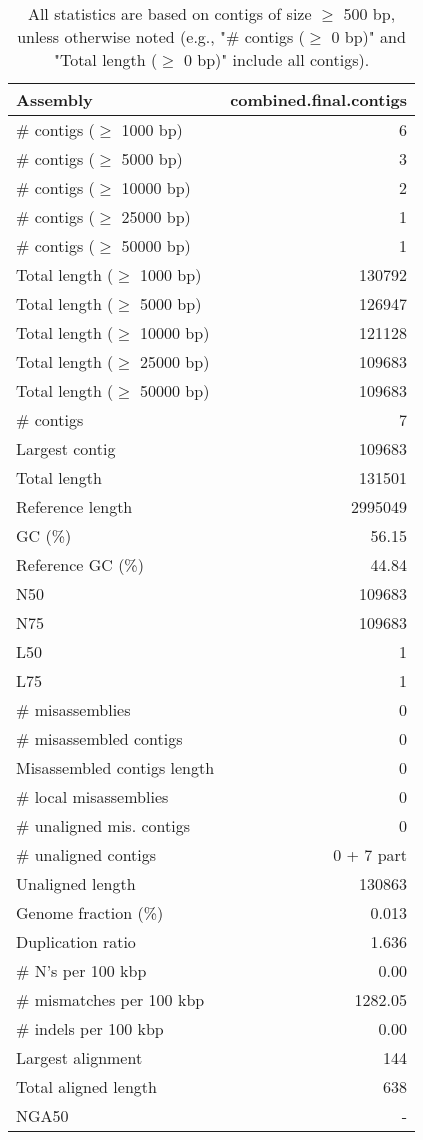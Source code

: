 \documentclass[12pt,a4paper]{article}
\begin{document}
\begin{table}[ht]
\begin{center}
\caption{All statistics are based on contigs of size $\geq$ 500 bp, unless otherwise noted (e.g., "\# contigs ($\geq$ 0 bp)" and "Total length ($\geq$ 0 bp)" include all contigs).}
\begin{tabular}{|l*{1}{|r}|}
\hline
Assembly & combined.final.contigs \\ \hline
\# contigs ($\geq$ 1000 bp) & 6 \\ \hline
\# contigs ($\geq$ 5000 bp) & 3 \\ \hline
\# contigs ($\geq$ 10000 bp) & 2 \\ \hline
\# contigs ($\geq$ 25000 bp) & 1 \\ \hline
\# contigs ($\geq$ 50000 bp) & 1 \\ \hline
Total length ($\geq$ 1000 bp) & 130792 \\ \hline
Total length ($\geq$ 5000 bp) & 126947 \\ \hline
Total length ($\geq$ 10000 bp) & 121128 \\ \hline
Total length ($\geq$ 25000 bp) & 109683 \\ \hline
Total length ($\geq$ 50000 bp) & 109683 \\ \hline
\# contigs & 7 \\ \hline
Largest contig & 109683 \\ \hline
Total length & 131501 \\ \hline
Reference length & 2995049 \\ \hline
GC (\%) & 56.15 \\ \hline
Reference GC (\%) & 44.84 \\ \hline
N50 & 109683 \\ \hline
N75 & 109683 \\ \hline
L50 & 1 \\ \hline
L75 & 1 \\ \hline
\# misassemblies & 0 \\ \hline
\# misassembled contigs & 0 \\ \hline
Misassembled contigs length & 0 \\ \hline
\# local misassemblies & 0 \\ \hline
\# unaligned mis. contigs & 0 \\ \hline
\# unaligned contigs & 0 + 7 part \\ \hline
Unaligned length & 130863 \\ \hline
Genome fraction (\%) & 0.013 \\ \hline
Duplication ratio & 1.636 \\ \hline
\# N's per 100 kbp & 0.00 \\ \hline
\# mismatches per 100 kbp & 1282.05 \\ \hline
\# indels per 100 kbp & 0.00 \\ \hline
Largest alignment & 144 \\ \hline
Total aligned length & 638 \\ \hline
NGA50 & - \\ \hline
\end{tabular}
\end{center}
\end{table}
\end{document}
